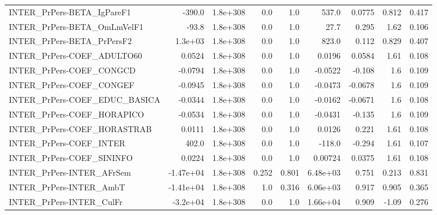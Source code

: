 \begin{tabular}{lrrrrrrrr}
INTER\_PrPers-BETA\_IgPareF1            &      -390.0 &     1.8e+308 &     0.0 &      1.0 &      537.0 &      0.0775 &        0.812 &         0.417 \\
INTER\_PrPers-BETA\_OmLmVelF1           &       -93.8 &     1.8e+308 &     0.0 &      1.0 &       27.7 &       0.295 &         1.62 &         0.106 \\
INTER\_PrPers-BETA\_PrPersF2            &     1.3e+03 &     1.8e+308 &     0.0 &      1.0 &      823.0 &       0.112 &        0.829 &         0.407 \\
INTER\_PrPers-COEF\_ADULTO60            &      0.0524 &     1.8e+308 &     0.0 &      1.0 &     0.0196 &      0.0584 &         1.61 &         0.108 \\
INTER\_PrPers-COEF\_CONGCD              &     -0.0794 &     1.8e+308 &     0.0 &      1.0 &    -0.0522 &      -0.108 &          1.6 &         0.109 \\
INTER\_PrPers-COEF\_CONGEF              &     -0.0945 &     1.8e+308 &     0.0 &      1.0 &    -0.0473 &     -0.0678 &          1.6 &         0.109 \\
INTER\_PrPers-COEF\_EDUC\_BASICA         &     -0.0344 &     1.8e+308 &     0.0 &      1.0 &    -0.0162 &     -0.0671 &          1.6 &         0.108 \\
INTER\_PrPers-COEF\_HORAPICO            &     -0.0534 &     1.8e+308 &     0.0 &      1.0 &    -0.0431 &      -0.135 &          1.6 &         0.109 \\
INTER\_PrPers-COEF\_HORASTRAB           &      0.0111 &     1.8e+308 &     0.0 &      1.0 &     0.0126 &       0.221 &         1.61 &         0.108 \\
INTER\_PrPers-COEF\_INTER               &       402.0 &     1.8e+308 &     0.0 &      1.0 &     -118.0 &      -0.294 &         1.61 &         0.107 \\
INTER\_PrPers-COEF\_SININFO             &      0.0224 &     1.8e+308 &     0.0 &      1.0 &    0.00724 &      0.0375 &         1.61 &         0.108 \\
INTER\_PrPers-INTER\_AFrSem             &   -1.47e+04 &     1.8e+308 &   0.252 &    0.801 &   6.48e+03 &       0.751 &        0.213 &         0.831 \\
INTER\_PrPers-INTER\_AmbT               &   -1.41e+04 &     1.8e+308 &     1.0 &    0.316 &   6.06e+03 &       0.917 &        0.905 &         0.365 \\
INTER\_PrPers-INTER\_CulFr              &    -3.2e+04 &     1.8e+308 &     0.0 &      1.0 &   1.66e+04 &       0.909 &        -1.09 &         0.276 \\

\end{tabular}
